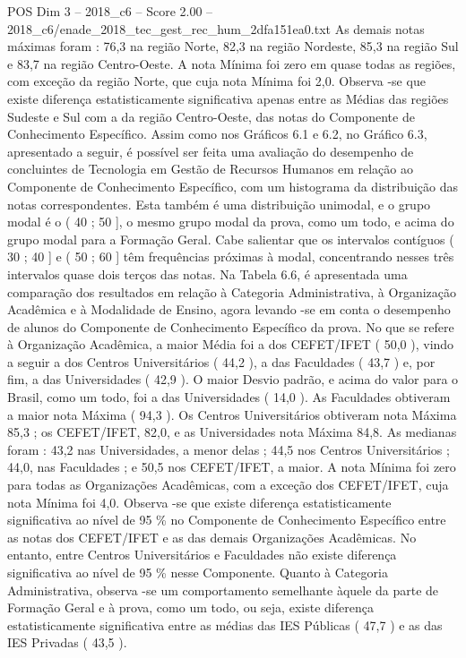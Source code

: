 \begin{textsample}{POS Dim 3 – 2018\_c6 – Score 2.00 – 2018\_c6/enade\_2018\_tec\_gest\_rec\_hum\_2dfa151ea0.txt}
As demais notas máximas foram : 76,3 na região Norte, 82,3 na região Nordeste, 85,3 na região Sul e 83,7 na região Centro-Oeste.
A nota Mínima foi zero em quase todas as regiões, com exceção da região Norte, que cuja nota Mínima foi 2,0.
Observa -se que existe diferença estatisticamente significativa apenas entre as Médias das regiões Sudeste e Sul com a da região Centro-Oeste, das notas do Componente de Conhecimento Específico.
Assim como nos Gráficos 6.1 e 6.2, no Gráfico 6.3, apresentado a seguir, é possível ser feita uma avaliação do desempenho de concluintes de Tecnologia em Gestão de Recursos Humanos em relação ao Componente de Conhecimento Específico, com um histograma da distribuição das notas correspondentes.
Esta também é uma distribuição unimodal, e o grupo modal é o ( 40 ; 50 ], o mesmo grupo modal da prova, como um todo, e acima do grupo modal para a Formação Geral.
Cabe salientar que os intervalos contíguos ( 30 ; 40 ] e ( 50 ; 60 ] têm frequências próximas à modal, concentrando nesses três intervalos quase dois terços das notas.
Na Tabela 6.6, é apresentada uma comparação dos resultados em relação à Categoria Administrativa, à Organização Acadêmica e à Modalidade de Ensino, agora levando -se em conta o desempenho de alunos do Componente de Conhecimento Específico da prova.
No que se refere à Organização Acadêmica, a maior Média foi a dos CEFET/IFET ( 50,0 ), vindo a seguir a dos Centros Universitários ( 44,2 ), a das Faculdades ( 43,7 ) e, por fim, a das Universidades ( 42,9 ).
O maior Desvio padrão, e acima do valor para o Brasil, como um todo, foi a das Universidades ( 14,0 ).
As Faculdades obtiveram a maior nota Máxima ( 94,3 ).
Os Centros Universitários obtiveram nota Máxima 85,3 ; os CEFET/IFET, 82,0, e as Universidades nota Máxima 84,8.
As medianas foram : 43,2 nas Universidades, a menor delas ; 44,5 nos Centros Universitários ; 44,0, nas Faculdades ; e 50,5 nos CEFET/IFET, a maior.
A nota Mínima foi zero para todas as Organizações Acadêmicas, com a exceção dos CEFET/IFET, cuja nota Mínima foi 4,0.
Observa -se que existe diferença estatisticamente significativa ao nível de 95 \% no Componente de Conhecimento Específico entre as notas dos CEFET/IFET e as das demais Organizações Acadêmicas.
No entanto, entre Centros Universitários e Faculdades não existe diferença significativa ao nível de 95 \% nesse Componente.
Quanto à Categoria Administrativa, observa -se um comportamento semelhante àquele da parte de Formação Geral e à prova, como um todo, ou seja, existe diferença estatisticamente significativa entre as médias das IES Públicas ( 47,7 ) e as das IES Privadas ( 43,5 ).

\end{textsample}
